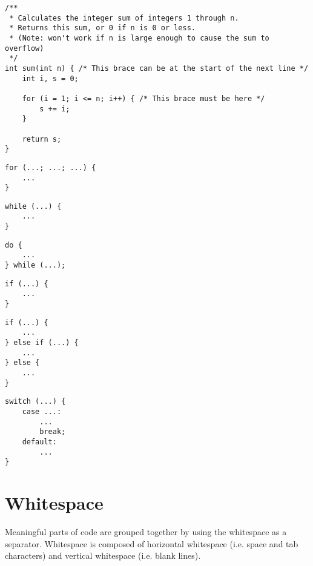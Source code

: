 \documentclass{article}
\begin{document}
\begin{lstlisting}
/**
 * Calculates the integer sum of integers 1 through n.
 * Returns this sum, or 0 if n is 0 or less.
 * (Note: won't work if n is large enough to cause the sum to overflow)
 */
int sum(int n) { /* This brace can be at the start of the next line */
    int i, s = 0;

    for (i = 1; i <= n; i++) { /* This brace must be here */
        s += i;
    }

    return s;
}
\end{lstlisting}

\begin{multicols}{2}
\begin{lstlisting}
for (...; ...; ...) {
    ...
}
\end{lstlisting}

\begin{lstlisting}
while (...) {
    ...
}
\end{lstlisting}

\begin{lstlisting}
do {
    ...
} while (...);
\end{lstlisting}

\begin{lstlisting}
if (...) {
    ...
}
\end{lstlisting}
\vfill
\columnbreak

\begin{lstlisting}
if (...) {
    ...
} else if (...) {
    ...
} else {
    ...
}
\end{lstlisting}

\begin{lstlisting}
switch (...) {
    case ...:
        ...
        break;
    default:
        ...
}
\end{lstlisting}
\end{multicols}

\clearpage
\section{Whitespace}
Meaningful parts of code are grouped together by using the whitespace as a separator.
Whitespace is composed of horizontal whitespace (i.e. space and tab characters) and vertical whitespace (i.e. blank lines).
\end{document}
